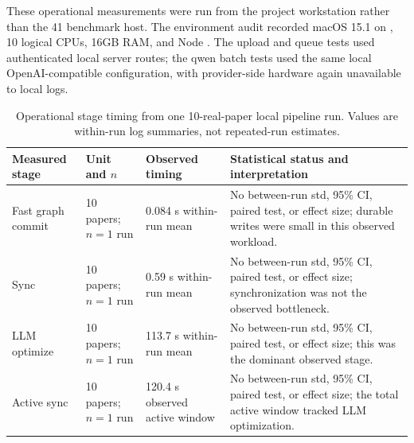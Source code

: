 \documentclass[11pt]{article}
\newcommand{\code}[1]{\texttt{\detokenize{#1}}}
\begin{document}
These operational measurements were run from the project workstation rather than the 41 benchmark host. The environment audit recorded macOS 15.1 on \code{arm64}, 10 logical CPUs, 16GB RAM, and Node \code{v25.4.0}. The upload and queue tests used authenticated local server routes; the qwen batch tests used the same local OpenAI-compatible \code{cliproxyapi} configuration, with provider-side hardware again unavailable to local logs.

\begin{table}[t]
\centering
\caption{Operational stage timing from one 10-real-paper local pipeline run. Values are within-run log summaries, not repeated-run estimates.}
\label{tab:local-stage-timing}
\scriptsize
\begin{tabularx}{\linewidth}{@{}l l l Y@{}}
\toprule
Measured stage & Unit and \(n\) & Observed timing & Statistical status and interpretation \\
\midrule
Fast graph commit & 10 papers; \(n=1\) run & 0.084 s within-run mean & No between-run std, 95\% CI, paired test, or effect size; durable writes were small in this observed workload. \\
Sync & 10 papers; \(n=1\) run & 0.59 s within-run mean & No between-run std, 95\% CI, paired test, or effect size; synchronization was not the observed bottleneck. \\
LLM optimize & 10 papers; \(n=1\) run & 113.7 s within-run mean & No between-run std, 95\% CI, paired test, or effect size; this was the dominant observed stage. \\
Active sync & 10 papers; \(n=1\) run & 120.4 s observed active window & No between-run std, 95\% CI, paired test, or effect size; the total active window tracked LLM optimization. \\
\bottomrule
\end{tabularx}
\end{table}
\end{document}

